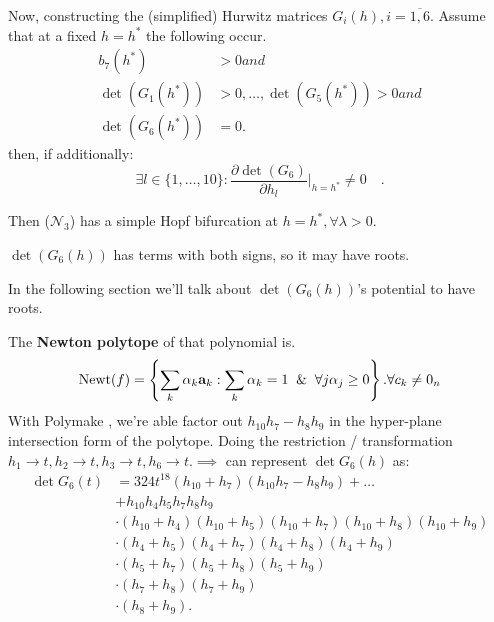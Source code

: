 \documentclass[aspectratio=169]{beamer}
\begin{document}
\begin{frame}
Now, constructing the (simplified) Hurwitz matrices $G_i(h), i = \overline{1,6}$. Assume that at a fixed $h = h^*$ the following occur.
\begin{equation}\label{eq:hopf-conditions}
	\begin{aligned}b_{7}(h^{*})&>0and\\\det(G_1(h^*))&>0,\ldots,\det(G_5(h^*))>0and\\\det(G_6(h^*))&=0.
	\end{aligned}
\end{equation}
then, if additionally:
\[
	\exists l\in\{1,\ldots,10\} : \frac{\partial\det(G_6)}{\partial h_l}|_{h=h^*}\neq0\quad.
\]

Then ($\mathcal{N}_3$) has a simple Hopf bifurcation at $h = h^*, \forall \lambda > 0$.

$\det(G_6(h))$ has terms with both signs, so it may have roots.

In the following section we'll talk about $\det(G_6(h))$'s potential to have roots.
\end{frame}

\begin{frame}
The \textbf{Newton polytope} of that polynomial is.
\[
	\mathrm{Newt}(f)=\left\{\sum_k\alpha_k\mathbf{a}_k:\sum_k\alpha_k=1 \And \forall j\alpha_j\geq0\right\}. \forall c_k \neq 0_n
\] With Polymake \cite{Gawrilow2000}, we're able factor out $h_{10}h_7 - h_8 h_9$ in the hyper-plane intersection form of the polytope.
Doing the restriction / transformation $h_1\to t,h_2\to t,h_3\to t,h_6\to t. \implies$ can represent $\det G_6(h)$ as:
\begin{equation}\label{eq:det-g6}
	\begin{aligned}
		\det G_6(t)
		&=324t^{18}(h_{10}+h_7)(h_{10}h_7-h_8h_9)+\ldots\\&+h_{10}h_4h_5h_7h_8h_9\\&\cdot(h_{10}+h_4)(h_{10}+h_5)(h_{10}+h_7)(h_{10}+h_8)(h_{10}+h_9)\\&\cdot(h_4+h_5)(h_4+h_7)(h_4+h_8)(h_4+h_9)\\&\cdot(h_5+h_7)(h_5+h_8)(h_5+h_9)\\&\cdot(h_7+h_8)(h_7+h_9)\\&\cdot(h_8+h_9).
	\end{aligned}
\end{equation}
\end{frame}
\end{document}
